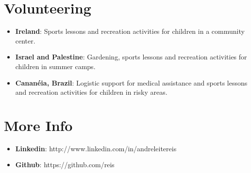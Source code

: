 \documentclass[margin]{res}
\begin{document}
\begin{resume}
\section{Volunteering}
	\begin{itemize}
	  \vspace{2mm}
		  \item \textbf{Ireland}: Sports lessons and recreation activities for children in a community center.\vspace{1mm}
		  \item \textbf{Israel and Palestine}: Gardening, sports lessons and recreation activities for children in summer camps.\vspace{1mm}
		  \item \textbf{Cananéia, Brazil}: Logistic support for medical assistance and sports lessons and recreation activities for children in risky areas.
	\end{itemize}
 
\section{More Info}
  \begin{itemize}
    \item \textbf{Linkedin}: http://www.linkedin.com/in/andreleitereis
    \item \textbf{Github}: https://github.com/reis
  \end{itemize}


\end{resume} 
\end{document}
